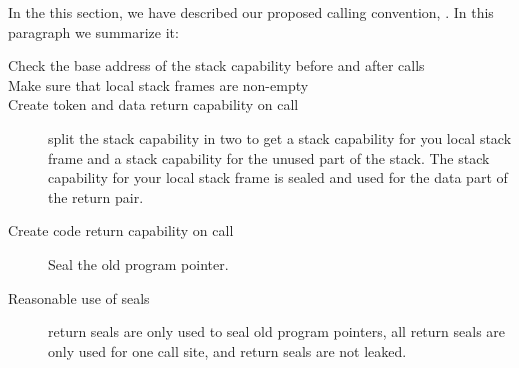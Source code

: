 \documentclass[acmsmall,review,anonymous]{acmart}\settopmatter{printfolios=true,printccs=false,printacmref=false}
\begin{document}
In the this section, we have described our proposed calling convention, \stktokens{}.
In this paragraph we summarize it:
\begin{description}
\item[Check the base address of the stack capability before and after calls] 
\item[Make sure that local stack frames are non-empty]
\item[Create token and data return capability on call] split the stack capability in two to get a stack capability for you local stack frame and a stack capability for the unused part of the stack. The stack capability for your local stack frame is sealed and used for the data part of the return pair.
\item[Create code return capability on call] Seal the old program pointer.
\item[Reasonable use of seals] return seals are only used to seal old program pointers, all return seals are only used for one call site, and return seals are not leaked.
\end{description}
\end{document}
